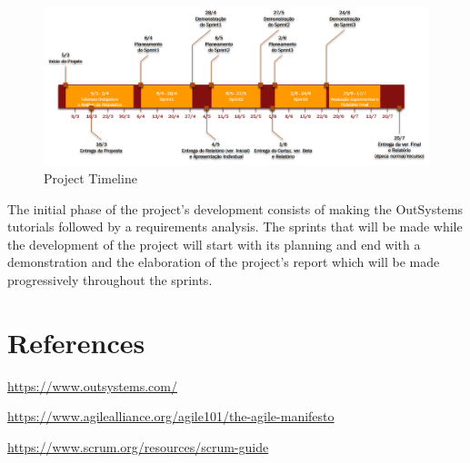 \documentclass[a4paper,openright,12pt]{report}
\begin{document}
\begin{figure}[H]
  \includegraphics[width=\linewidth]{./figures/Timeline Projeto LEIC.png}
  \caption{Project Timeline}\label{fig:schedule}
\end{figure}

The initial phase of the project's development consists of making the OutSystems tutorials followed by a requirements analysis. 
The sprints that will be made while the development of the project will start with its planning and end with a demonstration 
and the elaboration of the project's report which will be made progressively throughout the sprints.

\section*{References}
\begin{enumerate}[label={[\arabic*]}]
  \item \url{https://www.outsystems.com/}
  \item \url{https://www.agilealliance.org/agile101/the-agile-manifesto}
  \item \url{https://www.scrum.org/resources/scrum-guide}
\end{enumerate}
\end{document}
